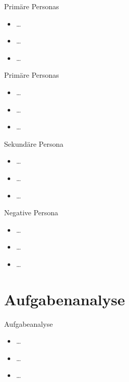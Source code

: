\documentclass[presentation,bigger,aspectratio=169]{beamer}
\begin{document}
\begin{frame}[label={sec:orgeb97dd4}]{Primäre Personas}
\begin{itemize}
\item \ldots{}
\item \ldots{}
\item \ldots{}
\end{itemize}
\end{frame}
\begin{frame}[label={sec:org142dfd9}]{Primäre Personas}
\begin{itemize}
\item \ldots{}
\item \ldots{}
\item \ldots{}
\end{itemize}
\end{frame}
\begin{frame}[label={sec:orgd70b959}]{Sekundäre Persona}
\begin{itemize}
\item \ldots{}
\item \ldots{}
\item \ldots{}
\end{itemize}
\end{frame}
\begin{frame}[label={sec:orgf7cf2e9}]{Negative Persona}
\begin{itemize}
\item \ldots{}
\item \ldots{}
\item \ldots{}
\end{itemize}
\end{frame}
\section{Aufgabenanalyse}
\label{sec:org44bed43}
\begin{frame}[label={sec:org27e149a}]{\vspace{2.2cm}\begin{center}\MakeUppercase{\insertsection}\end{center}}
\end{frame}

\begin{frame}[label={sec:orgaa0edb6}]{Aufgabeanalyse}
\begin{itemize}
\item \ldots{}
\item \ldots{}
\item \ldots{}
\end{itemize}
\end{frame}
\end{document}
